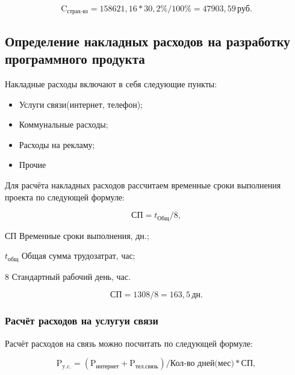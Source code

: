 \begin{equation*}
    \text{C}_\text{страх-вз} = 158621,16 * 30,2\% / 100\% = 47903,59 \, \text{руб}.
\end{equation*}

\tocless\subsection{Определение накладных расходов на разработку программного продукта}

Накладные расходы включают в себя следующие пункты:

\begin{itemize}
    \item Услуги связи(интернет, телефон);
    \item Коммунальные расходы;
    \item Расходы на рекламу;
    \item Прочие
\end{itemize}

Для расчёта накладных расходов рассчитаем временные сроки выполнения проекта по следующей
формуле:

\begin{equation}
    \text{СП} = t_\text{Общ} / 8,
\end{equation}

\begin{eqexpl}[5ex]
    \item{СП} Временные сроки выполнения, дн.;
    \item{$t_\text{общ}$} Общая сумма трудозатрат, час;
    \item{8} Стандартный рабочий день, час.
\end{eqexpl}

\begin{equation*}
    \text{СП} = 1308 / 8 = 163,5 \, \text{дн}.
\end{equation*}

\subsubsection{Расчёт расходов на услугуи связи}

Расчёт расходов на связь можно посчитать по следующей формуле:

\begin{equation}
    \text{P}_\text{y.c.} = (\text{P}_\text{интернет} + \text{P}_\text{тел.связь}) / \text{Кол-во дней(мес)} * \text{СП},
\end{equation}

